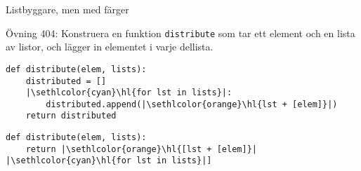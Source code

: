 \begin{frame}[fragile]{Listbyggare, men med färger}

  Övning 404: Konstruera en funktion \texttt{distribute} som tar ett element och
  en lista av listor, och lägger in elementet i varje dellista.

  \begin{lstlisting}
def distribute(elem, lists):
    distributed = []
    |\sethlcolor{cyan}\hl{for lst in lists}|:
        distributed.append(|\sethlcolor{orange}\hl{lst + [elem]}|)
    return distributed
  \end{lstlisting}

  \begin{lstlisting}
def distribute(elem, lists):
    return |\sethlcolor{orange}\hl{[lst + [elem]}| |\sethlcolor{cyan}\hl{for lst in lists}|]
  \end{lstlisting}

\end{frame}
